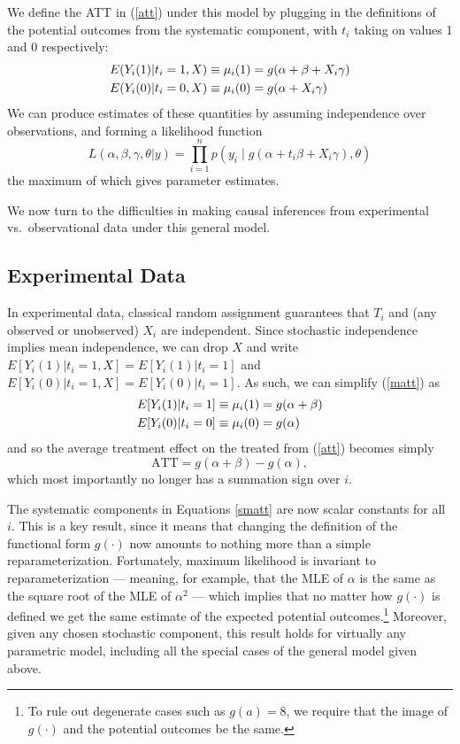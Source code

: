 \documentclass[11pt,titlepage]{article}
\begin{document}
We define the ATT in (\ref{att}) under this model by plugging in the
definitions of the potential outcomes from the systematic component,
with $t_i$ taking on values 1 and 0 respectively:
\begin{align}
  \label{matt}
  E(Y_i(1)|t_i=1,X) &\equiv \mu_i(1) = g(\alpha + \beta + X_i\gamma)\notag \\
  E(Y_i(0)|t_i=0,X) &\equiv \mu_i(0) = g(\alpha + X_i\gamma)
\end{align}
We can produce estimates of these quantities by assuming independence
over observations, and forming a likelihood function
\begin{equation}
  \label{lik}
  L(\alpha,\beta,\gamma,\theta|y) = \prod_{i=1}^n 
  p\left(y_i \mid g(\alpha + t_i\beta + X_i\gamma), \theta\right)
\end{equation}
the maximum of which gives parameter estimates.

We now turn to the difficulties in making causal inferences from
experimental vs.\ observational data under this general model.

\subsection{Experimental Data}\label{s:paraexp}

In experimental data, classical random assignment guarantees that
$T_i$ and (any observed or unobserved) $X_i$ are independent.  Since
stochastic independence implies mean independence, we can drop $X$ and
write $E[Y_i(1)|t_i=1,X]=E[Y_i(1)|t_i=1]$ and
$E[Y_i(0)|t_i=1,X]=E[Y_i(0)|t_i=1]$.  As such, we can simplify
(\ref{matt}) as
\begin{align}
  \label{smatt}
  E[Y_i(1)|t_i=1] &\equiv \mu_i(1) = g(\alpha + \beta)\notag \\
  E[Y_i(0)|t_i=0] &\equiv \mu_i(0) = g(\alpha)
\end{align}
and so the average treatment effect on the treated from (\ref{att})
becomes simply
\begin{equation}
  \label{satt}
  \text{ATT} = g(\alpha+\beta) - g(\alpha),
\end{equation}
which most importantly no longer has a summation sign over $i$.

The systematic components in Equations \ref{smatt} are now scalar
constants for all $i$.  This is a key result, since it means that
changing the definition of the functional form $g(\cdot)$ now amounts
to nothing more than a simple reparameterization.  Fortunately,
maximum likelihood is invariant to reparameterization --- meaning, for
example, that the MLE of $\alpha$ is the same as the square root of
the MLE of $\alpha^2$ \citep[][p.75-6]{King89} --- which implies that
no matter how $g(\cdot)$ is defined we get the same estimate of the
expected potential outcomes.\footnote{To rule out degenerate cases
  such as $g(a)=8$, we require that the image of $g(\cdot)$ and the
  potential outcomes be the same.} Moreover, given any chosen
stochastic component, this result holds for virtually any parametric
model, including all the special cases of the general model given
above.
\end{document}
